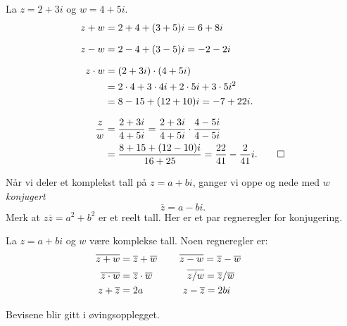\begin{ex}
La $z=2+3i$ og $w=4+5i$. 
\begin{align*}
z+w&=2+4+(3+5)i=6+8i \\[7pt]
z-w&=2-4+(3-5)i=-2-2i \\[7pt]
z\cdot w&=(2+3i)\cdot(4+5i)\\&=2\cdot 4+3\cdot 4i+2\cdot 5i+3\cdot 5 i^2\\&=8-15+(12+10)i=-7+22i.\\[7pt]
\frac{z}{w}&=\frac{2+3i}{4+5i}=\frac{2+3i}{4+5i}\cdot\frac{4-5i}{4-5i}\\&=\frac{8+15+(12-10)i}{16+25}=\frac{22}{41}-\frac{2}{41}i. \qedhere
\end{align*}
\end{ex}
Når vi deler et komplekst tall på $z=a+bi$, 
ganger vi oppe og nede med \emph{$w$ konjugert}
\[
\overline z =a-bi.
\]
Merk at $z\overline z=a^2+b^2$ er et reelt tall.
Her  er et par regneregler for konjugering.
\begin{tcolorbox}
\begin{thm}
La $z=a+bi$ og $w$ være komplekse tall. Noen regneregler er:
\begin{align*}
\overline{z+w}&=\overline{z} + \overline{w} \hspace{.8cm}
\overline{z-w}=\overline{z} - \overline{w} \\
\overline{z\cdot w}&=\overline{z} \cdot \overline{w} \hspace{1.25cm}
\overline{z/ w}=\overline{z} / \overline{w} \\
z+\overline{z}&=2a  \hspace{1.43cm}
z-\overline{z}=2bi  \hspace{1.43cm}
\end{align*}
\end{thm}
\vspace{1mm}
\end{tcolorbox}
\noindent Bevisene blir gitt i øvingsopplegget.






